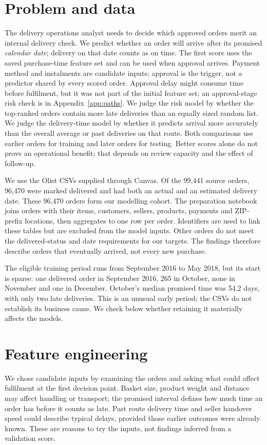 \documentclass[12pt,a4paper]{article}
\begin{document}
\section*{Problem and data}
The delivery operations analyst needs to decide which approved orders merit an internal delivery check. We predict whether an order will arrive after its promised \emph{calendar date}; delivery on that date counts as on time. The first score uses the saved purchase-time feature set and can be used when approval arrives. Payment method and instalments are candidate inputs; approval is the trigger, not a predictor shared by every scored order. Approval delay might consume time before fulfilment, but it was not part of the initial feature set; an approval-stage risk check is in Appendix~\ref{app:paths}. We judge the risk model by whether the top-ranked orders contain more late deliveries than an equally sized random list. We judge the delivery-time model by whether it predicts arrival more accurately than the overall average or past deliveries on that route. Both comparisons use earlier orders for training and later orders for testing. Better scores alone do not prove an operational benefit; that depends on review capacity and the effect of follow-up.

We use the Olist CSVs supplied through Canvas. Of the 99,441 source orders, 96,470 were marked delivered and had both an actual and an estimated delivery date. These 96,470 orders form our modelling cohort. The preparation notebook joins orders with their items, customers, sellers, products, payments and ZIP-prefix locations, then aggregates to one row per order. Identifiers are used to link these tables but are excluded from the model inputs. Other orders do not meet the delivered-status and date requirements for our targets. The findings therefore describe orders that eventually arrived, not every new purchase.

The eligible training period runs from September 2016 to May 2018, but its start is sparse: one delivered order in September 2016, 265 in October, none in November and one in December. October's median promised time was 54.2 days, with only two late deliveries. This is an unusual early period; the CSVs do not establish its business cause. We check below whether retaining it materially affects the models.

\section*{Feature engineering}
We chose candidate inputs by examining the orders and asking what could affect fulfilment at the first decision point. Basket size, product weight and distance may affect handling or transport; the promised interval defines how much time an order has before it counts as late. Past route delivery time and seller handover speed could describe typical delays, provided those earlier outcomes were already known. These are reasons to try the inputs, not findings inferred from a validation score.
\end{document}
